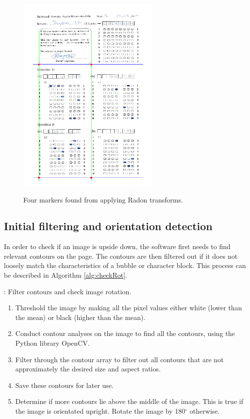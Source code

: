 \begin{figure}
  \centering
  \includegraphics[width=7cm]{RadonResults}\\
  \caption{Four markers found from applying Radon transforms.}
  \label{fig:radonResults}
\end{figure}

\subsection{Initial filtering and orientation detection}
\label{sec:InitImageFilter}

In order to check if an image is upside down, the software first needs to find relevant contours on the page. The contours are then filtered out if it does not loosely match the characteristics of a bubble or character block. This process can be described in Algorithm \ref{alg:checkRot}.

\begin{algorithm}[H]
\caption{: Filter contours and check image rotation.}
\label{alg:checkRot}
\begin{enumerate}
\item Threshold the image by making all the pixel values either white (lower than the mean) or black (higher than the mean).
\item Conduct contour analyses on the image to find all the contours, using the Python library OpenCV.
\item Filter through the contour array to filter out all contours that are not approximately the desired size and aspect ratios.
\item Save these contours for later use.
\item Determine if more contours lie above the middle of the image. This is true if the image is orientated upright. Rotate the image by 180$^{\circ}$ otherwise.
\end{enumerate}
\end{algorithm}


